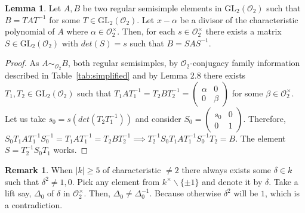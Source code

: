 \documentclass[10pt,twoside]{amsart}
\newcommand{\GL}{\mathrm{GL}}
\newcommand{\R}{\mathcal{O}_2}
\theoremstyle{definition}
\theoremstyle{definition}
\newtheorem{lemma}[theorem]{Lemma}
\newtheorem{remark}[theorem]{Remark}
\begin{document}
\begin{lemma}{\label{sim1}}
Let $A, B$ be two regular semisimple elements in $\GL_2(\R)$ such that $B = TAT^{-1}$ for some $T\in \GL_2(\R)$. Let $x - \alpha$ be a divisor of the characteristic polynomial of $A$ where $\alpha \in \R^{\times}$. Then, for each $s\in \R^{\times}$ there exists a matrix $S\in \GL_2(\R)$ with $det(S)=s$ such that $B = SAS^{-1}$.
\end{lemma}
\begin{proof}
As $A\sim _{\R}  B$, both regular semisimples, by $\R$-conjugacy family information described in Table~\ref{tab:simplified} and by Lemma 2.8 \cite{PanjaRoySingh2025} there exists $T_1, T_2 \in \GL_2(\R)$ such that  $T_1AT_1^{-1} = T_2BT_2^{-1} = \left(\begin{array}{cc}  \alpha & 0  \\ 0 & \beta \end{array}\right)$ for some $\beta\in \R^{\times}$. Let us take $s_0 = s (det(T_2 T_1^{-1}))$ and consider $S_0 = \left(\begin{array}{cc} s_0 & 0  \\ 0 & 1    \end{array} \right)$. Therefore, $S_0 T_1 A T_1^{-1} S_0^{-1} = T_1 A T_1^{-1} = T_2 B T_2^{-1} \implies T_2^{-1} S_0 T_1 A T_1^{-1} S_0^{-1} T_2 = B$. The element $S = T_2^{-1}S_0T_1$ works. 
\end{proof}

\begin{remark}{\label{existence of delta not}}
When $|k|\geq 5$ of characteristic $\neq 2$ there always exists some $\delta \in k$ such that $\delta^2\neq 1,0$. Pick any element from $k^{\times}\backslash\{\pm 1\}$ and denote it by $\delta$. Take a lift say, $\Delta_0$ of $\delta$ in $\R^{\times}$. Then, $\Delta_0\neq \Delta_0^{-1}$. Because otherwise $\delta^2$ will be $1$, which is a contradiction.
\end{remark}
\end{document}
